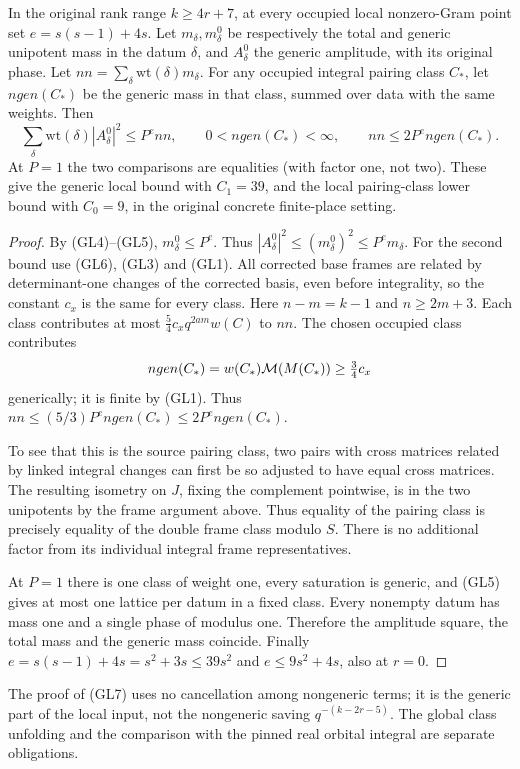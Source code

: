 \begin{theorem}\label{thm:flag-generic-local-amplitude}
In the original rank range \(k\ge4r+7\), at every occupied
local nonzero-Gram point set \(e=s(s-1)+4s\).
Let \(m_\delta,m_\delta^0\) be respectively the total and
generic unipotent mass in the datum \(\delta\), and \(A_\delta^0\)
the generic amplitude, with its original phase.
Let \(nn=\sum_\delta\mathrm{wt}(\delta)m_\delta\).
For any occupied integral pairing class \(C_*\), let
\(ngen(C_*)\) be the generic mass in that class, summed over
data with the same weights. Then
\[
 \sum_\delta\mathrm{wt}(\delta)|A_\delta^0|^2
       \le P^e nn,\qquad
 0<ngen(C_*)<\infty,\qquad nn\le2P^e ngen(C_*).
 \tag{GL7}
\]
At \(P=1\) the two comparisons are equalities (with factor
one, not two). These give the generic local bound with
\(C_1=39\), and the local pairing-class lower bound with
\(C_0=9\), in the original concrete finite-place setting.
\end{theorem}
\begin{proof}
By (GL4)--(GL5), \(m_\delta^0\le P^e\).
Thus \(|A_\delta^0|^2\le(m_\delta^0)^2\le P^e m_\delta\).
For the second bound use (GL6), (GL3) and (GL1).
All corrected base frames are related by determinant-one
changes of the corrected basis, even before integrality,
so the constant \(c_x\) is the same for every class.
Here \(n-m=k-1\) and \(n\ge2m+3\).
Each class contributes at most \(\tfrac54 c_x q^{2am}w(C)\)
to \(nn\). The chosen occupied class contributes
\[
 ngen(C_*)=w(C_*){\cal M}(M(C_*))
                  \ge\tfrac34 c_x
\]
generically; it is finite by (GL1). Thus \(nn\le
(5/3)P^e ngen(C_*)\le2P^e ngen(C_*)\).

To see that this is the source pairing class, two pairs
with cross matrices related by linked integral changes
can first be so adjusted to have equal cross matrices.
The resulting isometry on \(J\), fixing the complement
pointwise, is in the two unipotents by the frame argument
above. Thus equality of the pairing class is precisely
equality of the double frame class modulo \(S\).
There is no additional factor from its individual
integral frame representatives.

At \(P=1\) there is one class of weight one, every saturation
is generic, and (GL5) gives at most one lattice per datum
in a fixed class. Every nonempty datum has mass one and
a single phase of modulus one. Therefore the amplitude square,
the total mass and the generic mass coincide. Finally
\(e=s(s-1)+4s=s^2+3s\le39s^2\) and
\(e\le9s^2+4s\), also at \(r=0\).
\end{proof}

The proof of (GL7) uses no cancellation among nongeneric
terms; it is the generic part of the local input, not the
nongeneric saving \(q^{-(k-2r-5)}\).
The global class unfolding and the comparison with the
pinned real orbital integral are separate obligations.
